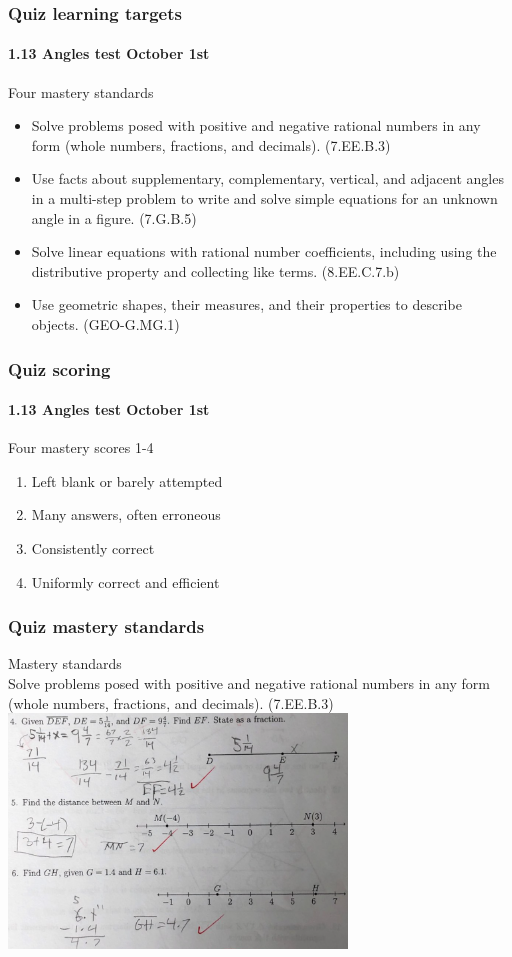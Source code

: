\documentclass{beamer}
\begin{document}
\frame
{
  \frametitle{Quiz learning targets}
  \framesubtitle{1.13 Angles test October 1st}

  \begin{block}{Four mastery standards}
    \begin{itemize}
    \item Solve problems posed with positive and negative rational numbers in any form (whole numbers, fractions, and decimals). (7.EE.B.3)
        
    \item Use facts about supplementary, complementary, vertical, and adjacent angles in a multi-step problem to write and solve simple equations for an unknown angle in a figure. (7.G.B.5)
    
    \item Solve linear equations with rational number coefficients, including using the distributive property and collecting like terms. (8.EE.C.7.b)
    
    \item Use geometric shapes, their measures, and their properties to describe objects. (GEO-G.MG.1)
    \end{itemize}
  \end{block}
}

\frame
{
  \frametitle{Quiz scoring}
  \framesubtitle{1.13 Angles test October 1st}

  \begin{block}{Four mastery scores 1-4}
    \begin{enumerate}
    \item Left blank or barely attempted
    \item Many answers, often erroneous
    \item Consistently correct
    \item Uniformly correct and efficient
    \end{enumerate}
  \end{block}
}

\frame
{
  \frametitle{Quiz mastery standards}

  Mastery standards\\
    Solve problems posed with positive and negative rational numbers in any form (whole numbers, fractions, and decimals). (7.EE.B.3)\\
    \includegraphics[width=9cm]{fractions.png}
}
\end{document}
